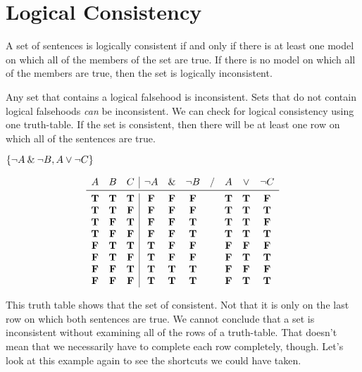 \documentclass[../logic-text.tex]{subfiles}
\begin{document}
\section{Logical Consistency}
\label{sec:logical-consistency}


A set of sentences is logically consistent if and only if there is at least one model on which all of the members of the set are true.
If there is no model on which all of the members are true, then the set is logically inconsistent.

Any set that contains a logical falsehood is inconsistent.
Sets that do not contain logical falsehoods \emph{can} be inconsistent.
We can check for logical consistency using one truth-table.
If the set is consistent, then there will be at least one row on which all of the sentences are true.


\(\{ \neg A \mathbin{\&} \neg B, A \lor \neg C\}\)


\[
\begin{array}{ccc|ccccccc}
  A & B & C & \lneg A & \land & \lneg B & / & A & \lor & \lneg C \\ \midrule
  \true & \true & \true & \false & \false & \false &  & \true & \true & \false  \\
  \true & \true & \false & \false & \false & \false && \true & \true & \true \\
  \true & \false & \true & \false & \false & \true && \true & \true & \false \\
  \true & \false & \false & \false & \false & \true && \true & \true & \true \\
  \false & \true & \true & \true & \false & \false && \false & \false &  \false \\
  \false & \true & \false & \true & \false & \false && \false & \true &  \true \\
  \false & \false & \true & \true & \true & \true && \false & \false &  \false \\
  \false & \false & \false & \true & \true & \true && \false & \true &  \true\\
\end{array}
\]

This truth table shows that the set of consistent.
Not that it is only on the last row on which both sentences are true.
We cannot conclude that a set is inconsistent without examining all of the rows of a truth-table.
That doesn't mean that we necessarily have to complete each row completely, though.
Let's look at this example again to see the shortcuts we could have taken.
\end{document}
